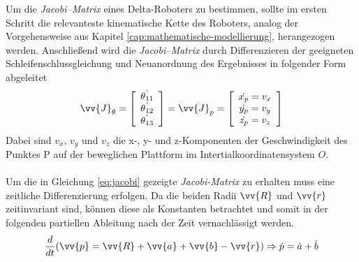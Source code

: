 \documentclass[Bachelor, BMR, ngerman]{twbook}
\begin{document}
    \noindent
    Um die \textit{Jacobi–Matrix} eines Delta-Roboters zu bestimmen, sollte im ersten Schritt die relevanteste kinematische Kette des Roboters, analog der Vorgehensweise aus Kapitel \ref{cap:mathematische-modellierung}, herangezogen werden. Anschließend wird die \textit{Jacobi–Matrix} durch Differenzieren der geeigneten Schleifenschlussgleichung und Neuanordnung des Ergebnisses in folgender Form abgeleitet
    \newline
    \begin{align}
        \vv{J}_\theta = 
            \left[
                \begin{array}{c} 
                    \dot{\theta\textsubscript{11}}\\
                    \dot{\theta\textsubscript{12}}\\
                    \dot{\theta\textsubscript{13}} 
                \end{array}
            \right]
        = \vv{J}_p = 
            \left[
                \begin{array}{c} 
                    \dot{x_p} = v_x\\
                    \dot{y_p} = v_y\\
                    \dot{z_p} = v_z 
                \end{array}
            \right]
        \label{eq:jacobi}
    \end{align}
    \noindent
    Dabei sind $v_x$, $v_y$ und $v_z$ die x-, y- und z-Komponenten der Geschwindigkeit des Punktes P auf der beweglichen Plattform im Intertialkoordinatensystem $O$.\\
    \\
    Um die in Gleichung \ref{eq:jacobi} gezeigte \textit{Jacobi-Matrix} zu erhalten muss 
    eine zeitliche Differenzierung erfolgen. Da die beiden Radii $\vv{R}$ und $\vv{r}$ zeitinvariant sind, können diese als Konstanten betrachtet und somit in der folgenden partiellen Ableitung nach der Zeit vernachlässigt werden.
    \newline
    \begin{align}
        \frac{d}{dt}(\vv{p} = \vv{R} + \vv{a} + \vv{b} - \vv{r}) \Rightarrow \dot{p} = \dot{a} + \dot{b}
        \label{eq:schleifenschlussgleichung-partielle-ableitung}
    \end{align}
\end{document}
